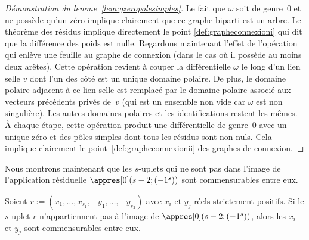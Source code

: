 \begin{proof}[Démonstration du lemme~\ref{lem:gzeropolesimples}]
Le fait que $\omega$ soit de genre~$0$ et ne possède qu'un zéro implique clairement que ce graphe biparti est un arbre. Le théorème des résidus implique directement le point \eqref{def:grapheconnexioni} qui dit que la différence des poids est nulle. Regardons maintenant l'effet de l'opération qui enlève une feuille au graphe de connexion (dans le cas où il possède au moins deux arêtes). Cette opération revient à couper la différentielle $\omega$ le long d'un lien selle $v$ dont l'un des côté est un unique domaine polaire. De plus, le domaine polaire adjacent à ce lien selle est remplacé par le domaine polaire associé aux vecteurs précédents privés de~$v$ (qui est un ensemble non vide car $\omega$ est non singulière). Les autres domaines polaires et les identifications restent les mêmes.
À chaque étape, cette opération produit une différentielle de genre~$0$ avec un unique zéro et des pôles simples dont tous les résidus sont non nuls. Cela implique clairement le point~\eqref{def:grapheconnexionii} des graphes de connexion.
\end{proof}

Nous montrons maintenant que les $s$-uplets qui ne sont pas dans l'image de l'application résiduelle $\appres[0](s-2;(-1^{s}))$ sont commensurables entre eux.
\begin{lem}\label{lem:finietcommens}
Soient $r:=(x_{1},\dots,x_{s_{1}},-y_{1},\dots,-y_{s_{2}})$ avec $x_{i}$ et $y_{j}$ réels strictement positifs. Si le $s$-uplet $r$ n'appartiennent pas à l'image de $\appres[0](s-2;(-1^{s}))$, alors les $x_{i}$ et $y_{j}$ sont commensurables entre eux.
\end{lem}

